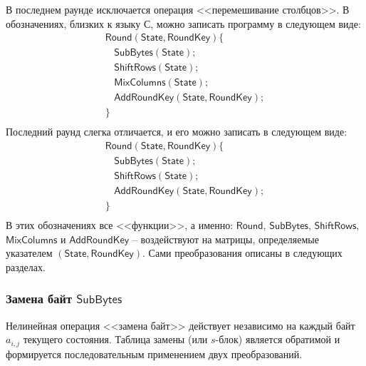 В последнем раунде исключается операция <<перемешивание столбцов>>. В обозначениях, близких к языку С, можно записать программу в следующем виде:
\[
    \begin{array}{l}
        \mathsf{Round(State, RoundKey)} \{ \\
        ~~~~ \mathsf{SubBytes(State)}; \\
        ~~~~ \mathsf{ShiftRows(State)}; \\
        ~~~~ \mathsf{MixColumns(State)}; \\
        ~~~~ \mathsf{AddRoundKey(State, RoundKey)}; \\
        \} \\
    \end{array}
\]
Последний раунд слегка отличается, и его можно записать в следующем виде:
\[
    \begin{array}{l}
        \mathsf{Round(State, RoundKey)} \{ \\
        ~~~~ \mathsf{SubBytes(State)}; \\
        ~~~~ \mathsf{ShiftRows(State)}; \\
        ~~~~ \mathsf{AddRoundKey(State, RoundKey)}; \\
        \} \\
    \end{array}
\]
В этих обозначениях все <<функции>>, а именно: $\mathsf{Round}$, $\mathsf{SubBytes}$, $\mathsf{ShiftRows}$, $\mathsf{MixColumns}$ и $\mathsf{AddRoundKey}$ -- воздействуют на матрицы, определяемые указателем $\mathsf{(State, RoundKey)}$. Сами преобразования описаны в следующих разделах.


\subsubsection{Замена байт $\mathsf{SubBytes}$}

Нелинейная операция <<замена байт>> действует независимо на каждый байт $a_{i,j}$ текущего состояния. Таблица замены (или $s$-блок) является обратимой и формируется последовательным применением двух преобразований.

